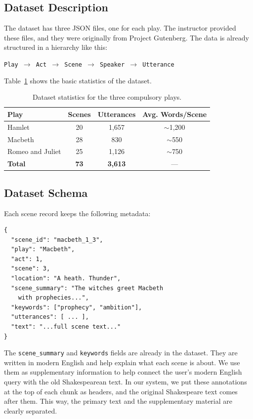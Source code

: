 \documentclass[10pt,conference]{IEEEtran}
\begin{document}
\subsection{Dataset Description}

The dataset has three JSON files, one for each play. The instructor provided these files, and they were originally from Project Gutenberg. The data is already structured in a hierarchy like this:

\begin{center}
\texttt{Play $\rightarrow$ Act $\rightarrow$ Scene $\rightarrow$ Speaker $\rightarrow$ Utterance}
\end{center}

Table~\ref{tab:dataset-stats} shows the basic statistics of the dataset.

\begin{table}[h]
\centering
\caption{Dataset statistics for the three compulsory plays.}
\label{tab:dataset-stats}
\begin{tabular}{lccc}
\toprule
Play & Scenes & Utterances & Avg. Words/Scene \\
\midrule
Hamlet & 20 & 1,657 & $\sim$1,200 \\
Macbeth & 28 & 830 & $\sim$550 \\
Romeo and Juliet & 25 & 1,126 & $\sim$750 \\
\midrule
\textbf{Total} & \textbf{73} & \textbf{3,613} & --- \\
\bottomrule
\end{tabular}
\end{table}

\subsection{Dataset Schema}

Each scene record keeps the following metadata:

\begin{lstlisting}[language={}]
{
  "scene_id": "macbeth_1_3",
  "play": "Macbeth",
  "act": 1,
  "scene": 3,
  "location": "A heath. Thunder",
  "scene_summary": "The witches greet Macbeth
    with prophecies...",
  "keywords": ["prophecy", "ambition"],
  "utterances": [ ... ],
  "text": "...full scene text..."
}
\end{lstlisting}

The \texttt{scene\_summary} and \texttt{keywords} fields are already in the dataset. They are written in modern English and help explain what each scene is about. We use them as supplementary information to help connect the user's modern English query with the old Shakespearean text. In our system, we put these annotations at the top of each chunk as headers, and the original Shakespeare text comes after them. This way, the primary text and the supplementary material are clearly separated.
\end{document}
